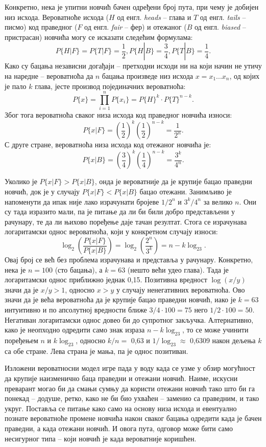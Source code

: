 \documentclass[12pt,oneside]{memoir}
\begin{document}
\begin{CJK}{UTF8}{ipxm}
Конкретно, нека је упитни новчић бачен одређени број пута, при чему је добијен низ исхода. Вероватноће исхода ($H$ од енгл. \textit{heads} -- глава и $T$ од енгл. \textit{tails} -- писмо) код праведног ($F$ од енгл. \textit{fair} -- фер) и отежаног ($B$ од енгл. \textit{biased} -- пристрасан) новчића могу се исказати следећим формулама: $$P\{H | F\} = P\{T | F\} = \frac{1}{2}, P\{H | B\} = \frac{3}{4}, P\{T | B\} = \frac{1}{4}.$$ Како су бацања независни догађаји -- претходни исходи ни на који начин не утичу на наредне -- вероватноћа да $n$ бацања произведе низ исхода $x = x_1...x_n$, од којих је пало $k$ глава, јесте производ појединачних вероватноћа: $$P\{x\} = \prod_{i=1}^n P\{x_i\} = P\{H\}^k \cdot P\{T\}^{n-k}.$$ Због тога вероватноћа сваког низа исхода код праведног новчића износи: $$P\{x | F\} = \left(\frac{1}{2}\right)^k \left(\frac{1}{2}\right)^{n-k} = \frac{1}{2^n}.$$ С друге стране, вероватноћа низа исхода код отежаног новчића је: $$P\{x | B\} = \left(\frac{3}{4}\right)^k \left(\frac{1}{4}\right)^{n-k} = \frac{3^k}{4^n}.$$

Уколико је $P\{x | F\} > P\{x | B\}$, онда је вероватније да је крупије бацао праведни новчић, док је у случају $P\{x | F\} < P\{x | B\}$ бацао отежани. Занимљиво је напоменути да ипак није лако израчунати бројеве $1/2^n$ и $3^k/4^n$ за велико $n$. Они су тада изразито мали, па је питање да ли би били добро представљени у рачунару, те да ли њихово поређење даје тачан резултат. Стога се израчунава логаритамски однос вероватноћа, који у конкретном случају износи: $$\log_2\left(\frac{P\{x | F\}}{P\{x | B\}}\right) = \log_2\left(\frac{2^n}{3^k}\right) = n - k\log_23.$$ Овај број се већ без проблема израчунава и представља у рачунару. Конкретно, нека је $n = 100$ (сто бацања), а $k = 63$ (нешто већи удео глава). Тада је логаритамски однос приближно једнак 0,15. Позитивна вредност $\log(x/y)$ значи да је $x/y > 1$, односно $x > y$ у случају ненегативних вероватноћа. Ово значи да је већа вероватноћа да је крупије бацао праведни новчић, иако је $k = 63$ интуитивно и по апсолутној вредности ближе $3/4 \cdot 100 = 75$ него $1/2 \cdot 100 = 50$. Негативан логаритамски однос довео би до супротног закључка. Алтернативно, како је неопходно одредити само знак израза $n - k\log_23$, то се може учинити поређењем $n$ и $k\log_23$, односно $k/n =$ 0,63 и $1/\log_23 \approx$ 0,6309 након дељења $k$ са обе стране. Лева страна је мања, па је однос позитиван.

Изложени вероватносни модел игре пада у воду када се узме у обзир могућност да крупије наизменично баца праведни и отежани новчић. Наиме, искусни преварант могао би да смањи сумњу да користи отежани новчић тако што би га понекад -- додуше, ретко, како не би био ухваћен -- заменио са праведним, и тако укруг. Поставља се питање како само на основу низа исхода и евентуално познате вероватноће промене новчића након сваког бацања одредити када је бачен праведни, а када отежани новчић. И овога пута, одговор може бити само несигурног типа -- који новчић је када вероватније коришћен.


\end{CJK}
\end{document}
